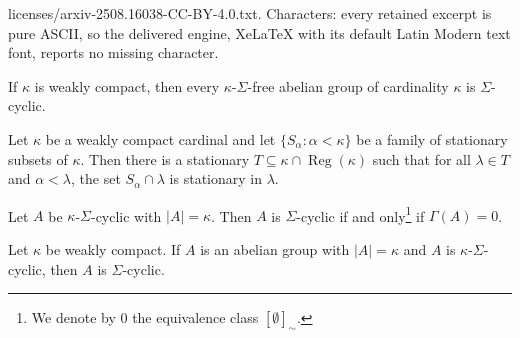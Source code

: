 \documentclass[10pt,a4paper]{amsart}
\DeclareMathOperator{\Reg}{Reg}
\begin{document}
licenses/arxiv-2508.16038-CC-BY-4.0.txt. Characters: every retained excerpt is pure ASCII, so the delivered engine, XeLaTeX with its default Latin Modern text font, reports no missing character.
\begin{theorem}
\label{thm : weak comp Sigma cyclic}
     If \(\kappa\) is weakly compact, then every \(\kappa\)-\(\Sigma\)-free abelian group of cardinality \(\kappa\) is \(\Sigma\)-cyclic.
\end{theorem}

\begin{lemma}
    \label{lem:reflection}
        Let \(\kappa\) be a weakly compact cardinal and let \(\{S_\alpha: \alpha<\kappa\}\) be a family of stationary subsets of \(\kappa\). Then there is a stationary \(T\subseteq \kappa \cap \Reg(\kappa)\) such that for all \(\lambda \in T\) and \(\alpha<\lambda\), the set
        \( S_\alpha \cap \lambda\) is stationary in \(\lambda\).
    \end{lemma}

    \begin{theorem}
        \label{thm:Gamma invariant groups}
        Let \(A\) be \(\kappa\)-\(\Sigma\)-cyclic with \(|A|=\kappa\). Then \(A\) is \(\Sigma\)-cyclic if and only\footnote{We denote by \(0\) the equivalence class \([\emptyset]_\sim\).} if \(\Gamma(A) = 0\).
    \end{theorem}

\begin{theorem}
        \label{thm:compactness sigma cyclic}
        Let \(\kappa\) be weakly compact. If \(A\) is an abelian group with \(|A| = \kappa\) and \(A\) is \(\kappa\)-\(\Sigma\)-cyclic, then \(A\) is \(\Sigma\)-cyclic.
    \end{theorem}
\end{document}
